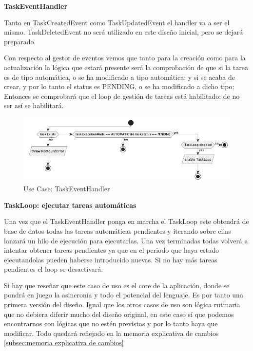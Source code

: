 \textbf{TaskEventHandler}

Tanto en TaskCreatedEvent como TaskUpdatedEvent el handler va a ser el mismo. TaskDeletedEvent no será utilizado en este diseño inicial, pero se dejará preparado.


Con respecto al gestor de eventos vemos que tanto para la creación como para la actualización la lógica que estará presente será la comprobación de que si la tarea es de tipo automática, o se ha modificado a tipo automática; y si se acaba de crear, y por lo tanto el status es PENDING, o se ha modificado a dicho tipo; Entonces se comprobará que el loop de gestión de tareas está habilitado; de no ser así se habilitará.

\begin{figure}[H]
    \centering
    \includegraphics[height=0.2\textheight]{./part/Proyecto_ejecutivo/memoria_descriptiva/descripcionDelProyecto/manager/uml/taskEventHandlerUseCase}
    \caption{Use Case: TaskEventHandler}\label{fig:Use Case-TaskEventHandler}
\end{figure}

\textbf{TaskLoop: ejecutar tareas automáticas}

Una vez que el TaskEventHandler ponga en marcha el TaskLoop este obtendrá de base de datos todas las tareas automáticas pendientes y iterando sobre ellas lanzará un hilo de ejecución para ejecutarlas. Una vez terminadas todas volverá a intentar obtener tareas pendientes ya que en el periodo que haya estado ejecutandolas pueden haberse introducido nuevas. Si no hay más tareas pendientes el loop se desactivará.

Si hay que reseñar que este caso de uso es el core de la aplicación, donde se pondrá en juego la asincronía y todo el potencial del lenguaje. Es por tanto una primera versión del diseño. Igual que los otros casos de uso son lógica rutinaria que no debiera diferir mucho del diseño original, en este caso sí que podemos encontrarnos con lógicas que no estén previstas y por lo tanto haya que modificar. Todo quedará reflejado en la memoria explicativa de cambios \ref{subsec:memoria explicativa de cambios}

